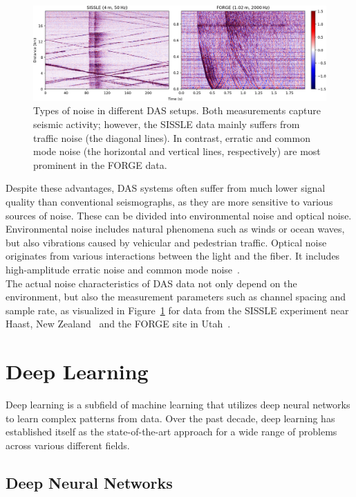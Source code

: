 \begin{figure}[b!]
    \includegraphics[width=\textwidth]{img/fig_2.2.png}
    \caption{
        Types of noise in different DAS setups.
        Both measurements capture seismic activity; however, the SISSLE data mainly suffers from traffic noise
        (the diagonal lines).
        In contrast, erratic and common mode noise (the horizontal and vertical lines,
        respectively) are most prominent in the FORGE data.
    }
    \label{fig:das-noise}
\end{figure}

Despite these advantages, DAS systems often suffer from much lower signal quality than conventional seismographs,
as they are more sensitive to various sources of noise.
These can be divided into environmental noise and optical noise.
Environmental noise includes natural phenomena such as winds or ocean waves, but also vibrations caused by vehicular and
pedestrian traffic.
Optical noise originates from various interactions between the light and the fiber.
It includes high-amplitude erratic noise and common mode noise~\cite{IDF}.\\
The actual noise characteristics of DAS data not only depend on the environment, but also the measurement parameters
such as channel spacing and sample rate, as visualized in Figure~\ref{fig:das-noise} for data from the SISSLE experiment
near Haast, New Zealand~\cite{SISSLE} and the FORGE site in Utah~\cite{FORGE}.

\section{Deep Learning}

Deep learning is a subfield of machine learning that utilizes deep neural networks to learn complex patterns from data. 
Over the past decade, deep learning has established itself as the state-of-the-art approach for a wide range of problems
across various different fields. %

\subsection{Deep Neural Networks}

